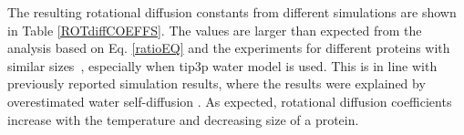 \documentclass[pre,aps,floatfix,authordate1-4,twocolumn]{revtex4-1}
\begin{document}
The resulting rotational diffusion constants from different simulations are
shown in Table \ref{ROTdiffCOEFFS}. The values are larger than 
expected from the analysis based on Eq. \ref{ratioEQ} and the experiments for different proteins with similar
sizes~\cite{krishnan98}, especially when tip3p water model is used.
This is in line with previously reported simulation results,
where the results were explained by overestimated water
self-diffusion \cite{wong08}. As expected, rotational diffusion coefficients
increase with the temperature and decreasing size of a protein.

\end{document}

